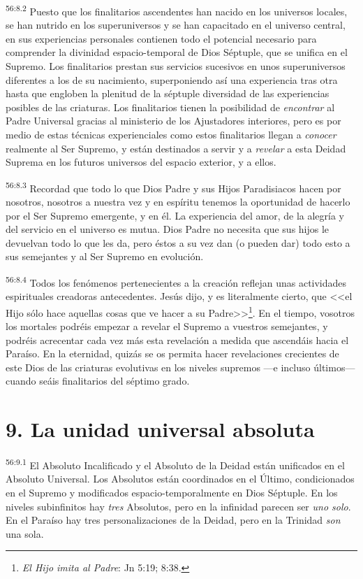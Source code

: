 \par
\textsuperscript{56:8.2} Puesto que los finalitarios ascendentes han nacido en los universos locales, se han nutrido en los superuniversos y se han capacitado en el universo central, en sus experiencias personales contienen todo el potencial necesario para comprender la divinidad espacio-temporal de Dios Séptuple, que se unifica en el Supremo. Los finalitarios prestan sus servicios sucesivos en unos superuniversos diferentes a los de su nacimiento, superponiendo así una experiencia tras otra hasta que engloben la plenitud de la séptuple diversidad de las experiencias posibles de las criaturas. Los finalitarios tienen la posibilidad de \textit{encontrar} al Padre Universal gracias al ministerio de los Ajustadores interiores, pero es por medio de estas técnicas experienciales como estos finalitarios llegan a \textit{conocer} realmente al Ser Supremo, y están destinados a servir y a \textit{revelar} a esta Deidad Suprema en los futuros universos del espacio exterior, y a ellos.

\par
\textsuperscript{56:8.3} Recordad que todo lo que Dios Padre y sus Hijos Paradisiacos hacen por nosotros, nosotros a nuestra vez y en espíritu tenemos la oportunidad de hacerlo por el Ser Supremo emergente, y en él. La experiencia del amor, de la alegría y del servicio en el universo es mutua. Dios Padre no necesita que sus hijos le devuelvan todo lo que les da, pero éstos a su vez dan (o pueden dar) todo esto a sus semejantes y al Ser Supremo en evolución.

\par
\textsuperscript{56:8.4} Todos los fenómenos pertenecientes a la creación reflejan unas actividades espirituales creadoras antecedentes. Jesús dijo, y es literalmente cierto, que <<el Hijo sólo hace aquellas cosas que ve hacer a su Padre>>\footnote{\textit{El Hijo imita al Padre}: Jn 5:19; 8:38.}. En el tiempo, vosotros los mortales podréis empezar a revelar el Supremo a vuestros semejantes, y podréis acrecentar cada vez más esta revelación a medida que ascendáis hacia el Paraíso. En la eternidad, quizás se os permita hacer revelaciones crecientes de este Dios de las criaturas evolutivas en los niveles supremos ---e incluso últimos--- cuando seáis finalitarios del séptimo grado.

\section*{9. La unidad universal absoluta}
\par
\textsuperscript{56:9.1} El Absoluto Incalificado y el Absoluto de la Deidad están unificados en el Absoluto Universal. Los Absolutos están coordinados en el Último, condicionados en el Supremo y modificados espacio-temporalmente en Dios Séptuple. En los niveles subinfinitos hay \textit{tres} Absolutos, pero en la infinidad parecen ser \textit{uno solo}. En el Paraíso hay tres personalizaciones de la Deidad, pero en la Trinidad \textit{son} una sola.

